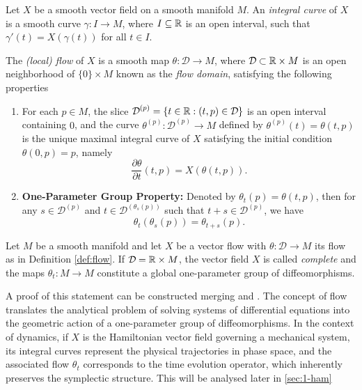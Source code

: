\begin{definition}\label{def:flow}
	Let $X$ be a smooth vector field on a smooth manifold $M$. An \textit{integral curve} of $X$ is a smooth curve $\gamma: I \to M$, where $I \subseteq \mathbb{R}$ is an open interval, such that $\gamma'(t) = X(\gamma(t))$ for all $t \in I$.
	
	\noindent The \textit{(local) flow} of $X$ is a smooth map $\theta: \mathcal{D} \to M$, where $\mathcal{D} \subset \R \times M$ is an open neighborhood of $\{0\} \times M$ known as the \textit{flow domain}, satisfying the following properties
	\begin{enumerate}
		\item For each $p \in M$, the slice $\mathcal{D}^{(p)} = \{t \in \R : (t, p) \in \mathcal{D}\}$ is an open interval containing $0$, and the curve $\theta^{(p)}: \mathcal{D}^{(p)} \to M$ defined by $\theta^{(p)}(t) = \theta(t, p)$ is the unique maximal integral curve of $X$ satisfying the initial condition $\theta(0, p) = p$, namely
		\[
		\frac{\partial \theta}{\partial t}(t, p) = X(\theta(t, p)).
		\]
		\item \textbf{One-Parameter Group Property:} Denoted by $\theta_t(p) = \theta(t, p)$, then for any $s \in \mathcal{D}^{(p)}$ and $t \in \mathcal{D}^{(\theta_s(p))}$ such that $t+s \in \mathcal{D}^{(p)}$, we have
		\[
		\theta_t(\theta_s(p)) = \theta_{t+s}(p).
		\]
	\end{enumerate}
\end{definition}

\begin{proposition}
	Let $M$ be a smooth manifold and let $X$ be a vector flow with $\theta: \mathcal{D} \to M$ its flow as in Definition \ref{def:flow}. If $\mathcal{D} = \R \times M$, the vector field $X$ is called \textit{complete} and the maps $\theta_t: M \to M$ constitute a global one-parameter group of diffeomorphisms.
\end{proposition}

A proof of this statement can be constructed merging \cite[Proposition 9.7]{leeIntroductionSmoothManifolds2013} and \cite[Theorem 9.12]{leeIntroductionSmoothManifolds2013}. The concept of flow translates the analytical problem of solving systems of differential equations into the geometric action of a one-parameter group of diffeomorphisms. In the context of dynamics, if $X$ is the Hamiltonian vector field governing a mechanical system, its integral curves represent the physical trajectories in phase space, and the associated flow $\theta_t$ corresponds to the time evolution operator, which inherently preserves the symplectic structure. This will be analysed later in \ref{sec:1-ham}

